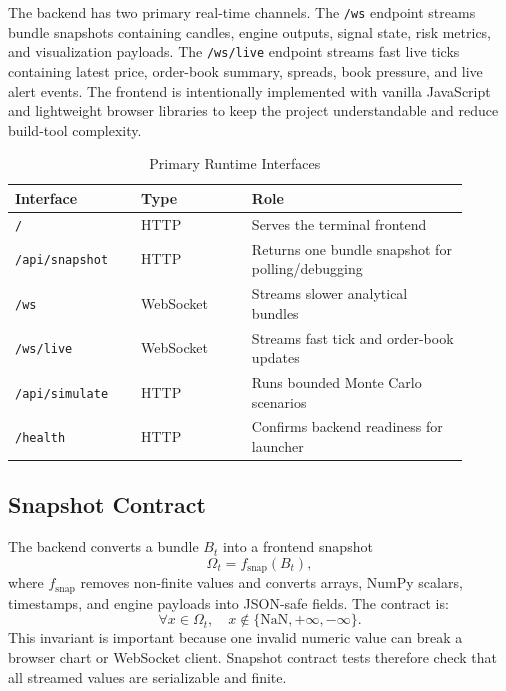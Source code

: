 \documentclass[conference]{IEEEtran}
\begin{document}
The backend has two primary real-time channels. The \texttt{/ws} endpoint
streams bundle snapshots containing candles, engine outputs, signal state,
risk metrics, and visualization payloads. The \texttt{/ws/live} endpoint
streams fast live ticks containing latest price, order-book summary, spreads,
book pressure, and live alert events. The frontend is intentionally
implemented with vanilla JavaScript and lightweight browser libraries to keep
the project understandable and reduce build-tool complexity.

\begin{table}[!t]
\caption{Primary Runtime Interfaces}
\label{tab:interfaces}
\centering
\begin{tabular}{@{}p{0.25\linewidth}p{0.22\linewidth}p{0.43\linewidth}@{}}
\toprule
\textbf{Interface} & \textbf{Type} & \textbf{Role} \\
\midrule
\texttt{/} & HTTP & Serves the terminal frontend \\
\texttt{/api/snapshot} & HTTP & Returns one bundle snapshot for polling/debugging \\
\texttt{/ws} & WebSocket & Streams slower analytical bundles \\
\texttt{/ws/live} & WebSocket & Streams fast tick and order-book updates \\
\texttt{/api/simulate} & HTTP & Runs bounded Monte Carlo scenarios \\
\texttt{/health} & HTTP & Confirms backend readiness for launcher \\
\bottomrule
\end{tabular}
\end{table}

\subsection{Snapshot Contract}

The backend converts a bundle $B_t$ into a frontend snapshot
\begin{equation}
\Omega_t = f_{\mathrm{snap}}(B_t),
\end{equation}
where $f_{\mathrm{snap}}$ removes non-finite values and converts arrays,
NumPy scalars, timestamps, and engine payloads into JSON-safe fields. The
contract is:
\begin{equation}
\forall x\in\Omega_t,\quad x\notin\{\mathrm{NaN},+\infty,-\infty\}.
\end{equation}
This invariant is important because one invalid numeric value can break a
browser chart or WebSocket client. Snapshot contract tests therefore check
that all streamed values are serializable and finite.
\end{document}
